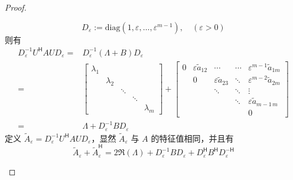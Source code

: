 \begin{proof}
\begin{enumerate}
\[                  D_\varepsilon := \text{diag}(1,\varepsilon,\dots,\varepsilon^{m-1}),\quad (\varepsilon > 0)
              \]
              则有
              \begin{align*}
                  D_\varepsilon^{-1} U^\mathsf{H} A U D_\varepsilon
                  ={} & D_\varepsilon^{-1} ( \Lambda + B ) D_\varepsilon    \\
                  ={} & \begin{bmatrix}
                            \lambda_1 &           &        &        &           \\
                                      & \lambda_2 &        &        &           \\
                                      &           & \ddots &        &           \\
                                      &           &        & \ddots &           \\
                                      &           &        &        & \lambda_m
                        \end{bmatrix}
                  +
                  \begin{bmatrix}
                      0 & \varepsilon \tilde{a}_{12} & \cdots                    & \cdots & \varepsilon^{m-1} \tilde{a}_{1m} \\
                        & 0                          & \varepsilon\tilde{a}_{23} & \ddots & \varepsilon^{m-2} \tilde{a}_{2m} \\
                        &                            & \ddots                    & \ddots & \vdots                           \\
                        &                            &                           & \ddots & \varepsilon \tilde{a}_{m-1\,m}   \\
                        &                            &                           &        & 0
                  \end{bmatrix}
                  \\
                  ={} & \Lambda + D_\varepsilon^{-1} B D_\varepsilon
              \end{align*}
              定义 $\widetilde{A}_\varepsilon = D_\varepsilon^{-1} U^\mathsf{H} A U D_\varepsilon$，显然 $\widetilde{A}_\varepsilon$ 与 $A$ 的特征值相同，并且有
              \[
                  \widetilde{A}_\varepsilon + \widetilde{A}^{\mathsf{H}}_\varepsilon
                  ={}  2 \Re(\Lambda) + D_\varepsilon^{-1} B D_\varepsilon + D_\varepsilon^{\mathsf{H}} B^{\mathsf{H}} D_\varepsilon^{-\mathsf{H}}
\]
\end{enumerate}
\end{proof}
